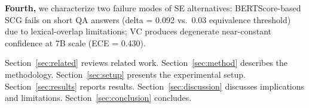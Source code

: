 \textbf{Fourth,} we characterize two failure modes of SE alternatives: BERTScore-based SCG fails on short QA answers (delta = 0.092 vs.\ 0.03 equivalence threshold) due to lexical-overlap limitations; VC produces degenerate near-constant confidence at 7B scale (ECE = 0.430).

Section~\ref{sec:related} reviews related work.
Section~\ref{sec:method} describes the methodology.
Section~\ref{sec:setup} presents the experimental setup.
Section~\ref{sec:results} reports results.
Section~\ref{sec:discussion} discusses implications and limitations.
Section~\ref{sec:conclusion} concludes.
